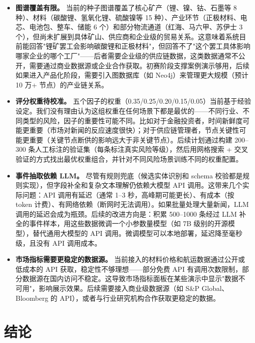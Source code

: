 \documentclass[12pt,a4paper]{ctexart}
\begin{document}
\begin{itemize}
    \item \textbf{图谱覆盖有限。} 当前的种子图谱覆盖了核心矿产（锂、镍、钴、石墨等 8 种）、材料（碳酸锂、氢氧化锂、硫酸镍等 15 种）、产业环节（正极材料、电芯、电池包、整车、储能 6 个）和部分物流通道（红海、马六甲、苏伊士 3 个），但尚未扩展到具体矿山、供应商和企业级的贸易关系。这意味着系统目前能回答"锂矿罢工会影响碳酸锂和正极材料"，但回答不了"这个罢工具体影响哪家企业的哪个工厂"——后者需要企业级的供应链数据，这类数据通常不公开，需要通过商业数据源或企业合作获取。初赛阶段支撑案例演示够用，后续如果进入产品化阶段，需要引入图数据库（如 Neo4j）来管理更大规模（预计 10 万+ 节点）的产业链关系。
    
    \item \textbf{评分权重待校准。} 五个因子的权重（0.35/0.25/0.20/0.15/0.05）当前基于经验设定。我们没有理由认为这组权重在任何场景下都是最优的——不同行业、不同类型的风险，因子的重要性可能不同。比如对于金融投资者，时间新鲜度可能更重要（市场对新闻的反应速度很快）；对于供应链管理者，节点关键性可能更重要（关键节点断供的影响远大于非关键节点）。后续计划通过构建 200--300 条人工标注的验证集（每条标注真实风险等级），然后用网格搜索 + 交叉验证的方式找出最优权重组合，并针对不同风险场景训练不同的权重配置。
    
    \item \textbf{事件抽取依赖 LLM。} 尽管有规则兜底（候选实体识别和 schema 校验都是规则实现），但字段补全和复杂文本理解仍依赖大模型 API 调用。这带来几个实际问题：API 调用有延迟（通常 1--3 秒，高峰期可能更长）、有成本（按 token 计费）、有网络依赖（断网时无法调用）。如果批量处理大量新闻，LLM 调用的延迟会成为瓶颈。后续的改进方向是：积累 500--1000 条经过 LLM 补全的事件样本，用这些数据微调一个小参数量模型（如 7B 级别的开源模型），替代通用大模型的 API 调用。微调模型可以本地部署，延迟降至毫秒级，且没有 API 调用成本。
    
    \item \textbf{市场指标需要更稳定的数据源。} 当前接入的材料价格和航运数据通过公开或低成本的 API 获取，稳定性不够理想——部分免费 API 有调用次数限制，部分数据源在国内访问不稳定。这导致市场指标面板在某些演示中显示"数据不可用"，影响展示效果。后续需要接入商业级数据源（如 S\&P Global、Bloomberg 的 API），或者与行业研究机构合作获取更稳定的数据。
\end{itemize}

\section{结论}
\end{document}

